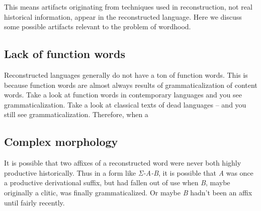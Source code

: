 \documentclass[a4paper, oneside, scheme=plain, 12pt]{article}
\newcommand{\form}[1]{\emph{#1}}
\begin{document}
This means artifacts originating from techniques used in reconstruction,
not real historical information, appear in the reconstructed language.
Here we discuss some possible artifacts relevant to the problem of wordhood.

\subsection{Lack of function words}

Reconstructed languages generally do not have a ton of function words.
This is because function words are almost always results of grammaticalization of content words.
Take a look at function words in contemporary languages and you see grammaticalization.
Take a look at classical texts of dead languages -- and you still see grammaticalization.
Therefore, when a 

\subsection{Complex morphology}

It is possible that two affixes of a reconstructed word were never both highly productive historically.
Thus in a form like \form{Σ-A-B}, it is possible that \form{A} was once a productive derivational suffix,
but had fallen out of use when \form{B}, maybe originally a clitic, was finally grammaticalized.
Or maybe \form{B} hadn't been an affix until fairly recently.

\printbibliography
\end{document}

